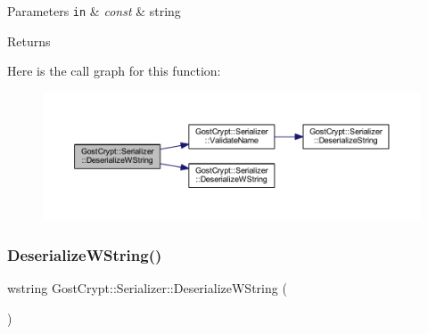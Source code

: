 \begin{DoxyParams}[1]{Parameters}
\mbox{\tt in}  & {\em const} & string \\
\hline
\end{DoxyParams}
\begin{DoxyReturn}{Returns}

\end{DoxyReturn}
Here is the call graph for this function\+:
\nopagebreak
\begin{figure}[H]
\begin{center}
\leavevmode
\includegraphics[width=350pt]{class_gost_crypt_1_1_serializer_ac31f5f6d18736800e791e843c1612a8b_cgraph}
\end{center}
\end{figure}
\mbox{\label{class_gost_crypt_1_1_serializer_a1100ca9636e8d1cc3e7636a03f30d06b}} 
\subsubsection{\texorpdfstring{Deserialize\+W\+String()}{DeserializeWString()}\hspace{0.1cm}{\footnotesize\ttfamily [2/2]}}
{\footnotesize\ttfamily wstring Gost\+Crypt\+::\+Serializer\+::\+Deserialize\+W\+String (\begin{DoxyParamCaption}{ }\end{DoxyParamCaption})\hspace{0.3cm}{\ttfamily [protected]}}

